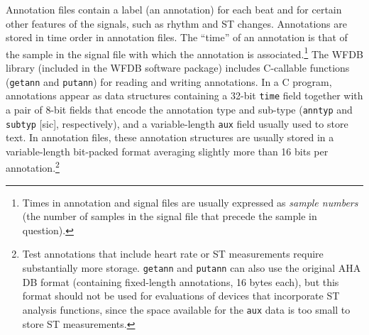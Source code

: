 Annotation files contain a label (an annotation) for each beat and for certain
other features of the signals, such as rhythm and ST changes.  Annotations are
stored in time order in annotation files.  The ``time'' of an annotation is
that of the sample in the signal file with which the annotation is
associated.\footnote{Times in annotation and signal files are usually expressed
as {\em sample numbers} (the number of samples in the signal file that precede
the sample in question).} The WFDB library (included in the WFDB software package)
includes C-callable functions ({\tt getann} and {\tt putann}) for reading and
writing annotations.  In a C program, annotations appear as data structures
containing a 32-bit {\tt time} field together with a pair of 8-bit fields that
encode the annotation type and sub-type ({\tt anntyp} and {\tt subtyp} [sic],
respectively), and a variable-length {\tt aux} field usually used to store
text.  In annotation files, these annotation structures are usually stored in
a variable-length bit-packed format averaging slightly more than 16 bits per
annotation.\footnote{Test annotations that include heart rate or ST
measurements require substantially more storage.  {\tt getann} and
{\tt putann} can also use the original AHA DB format (containing fixed-length
annotations, 16 bytes each), but this format should not be used for
evaluations of devices that incorporate ST analysis functions, since the
space available for the {\tt aux} data is too small to store ST measurements.}

